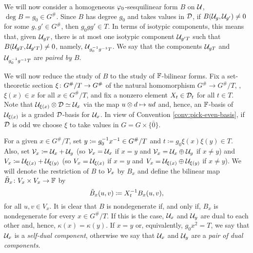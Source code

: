 
We will now consider a 
homogeneous $\varphi_0$-sesquilinear form $B$ on $\mathcal U$, $\deg B = g_0 \in G^\#$.
Since $B$ has degree $g_0$ and takes values in $\mathcal{D}$, if $B(\mathcal U_{g}, \mathcal U_{g'}) \neq 0$ for some $g, g' \in G^\#$, then $g_0 g g' \in T$. 
In terms of isotypic components, this means that, given $\mathcal U_{g T}$, there is at most one isotypic component $\mathcal U_{g'T}$ such that $B(\mathcal U_{gT}, \mathcal U_{g'T}) \neq 0$, namely, $\mathcal U_{g_0^{-1} g^{-1} T}$. 
We say that the components $\mathcal U_{gT}$ and $\mathcal U_{g_0^{-1} g^{-1} T}$ are \emph{paired by $B$}.



We will now reduce the study of $B$ to the study of $\mathbb{F}$-bilinear forms. 
Fix a set-theoretic section $\xi\colon G^\#/T \to G^\#$ of the natural homomorphism $ G^\# \to G^\#/T$, \ie, $\xi (x) \in x$ for all $x \in G^\#/T$, and fix a nonzero element $X_t \in \mathcal{D}_t$ for all $t\in T$. 
Note that $\mathcal U_{\xi(x)} \otimes \mathcal{D} \simeq \mathcal U_x$ via the map $u \otimes d \mapsto ud$ and, hence, an $\mathbb{F}$-basis of $\mathcal U_{\xi(x)}$ is a graded $\mathcal{D}$-basis for $\mathcal U_x$. 
In view of Convention \ref{conv:pick-even-basis}, if $\mathcal{D}$ is odd we choose $\xi$ to take values in $G = G\times \{ \bar 0 \}$.

For a given $x \in G^\#/T$, set $y \coloneqq g_0^{-1} x^{-1} \in G^\#/T$ and $t \coloneqq g_0 \xi(x) \xi(y) \in T$. 
Also, set $\mathcal V_x \coloneqq \mathcal U_x + \mathcal U_y$ (so $\mathcal V_x = \mathcal U_x$ if $x=y$ and $\mathcal V_x = \mathcal U_x \oplus \mathcal U_y$ if $x \neq y$) and $V_x \coloneqq \mathcal U_{\xi(x)} + \mathcal U_{\xi(y)}$ (so $V_x = \mathcal U_{\xi(x)}$ if $x=y$ and $V_x = \mathcal U_{\xi(x)} \oplus \mathcal U_{\xi(y)}$ if $x \neq y$). 
We will denote the restriction of $B$ to $\mathcal V_x$ by $B_x$ and define the bilinear map $\tilde{B}_x\colon V_x \times V_x \to \mathbb{F}$ by 
\begin{equation}\label{eq:B_x-tilde}
    \tilde{B}_x (u,v) \coloneqq X_{t}^{-1} B_x (u,v),
\end{equation}
for all $u,v \in V_x$. 
It is clear that $B$ is nondegenerate if, and only if, $B_x$ is nondegenerate for every $x \in G^\#/T$. 
If this is the case, $\mathcal U_x$ and $\mathcal U_y$ are dual to each other and, hence, $\kappa(x) = \kappa(y)$. 
If $x = y$ or, equivalently, $g_0 x^2 = T$, we say that $\mathcal U_x$ is a \emph{self-dual component}, otherwise we say that $\mathcal U_x$ and $\mathcal U_y$ are a \emph{pair of dual components}. 


